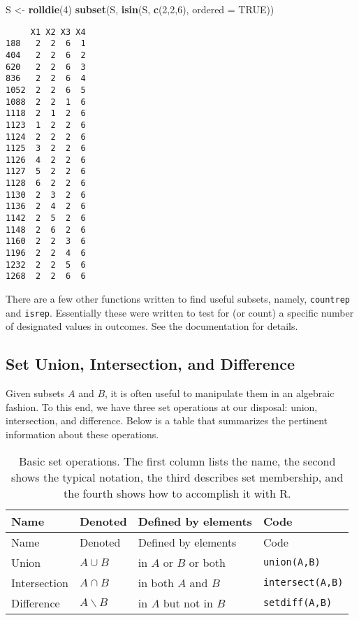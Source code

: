 \documentclass[]{book}
\newenvironment{Shaded}{\begin{snugshade}}{\end{snugshade}}
\newcommand{\KeywordTok}[1]{\textcolor[rgb]{0.13,0.29,0.53}{\textbf{{#1}}}}
\newcommand{\DataTypeTok}[1]{\textcolor[rgb]{0.13,0.29,0.53}{{#1}}}
\newcommand{\DecValTok}[1]{\textcolor[rgb]{0.00,0.00,0.81}{{#1}}}
\newcommand{\StringTok}[1]{\textcolor[rgb]{0.31,0.60,0.02}{{#1}}}
\newcommand{\OtherTok}[1]{\textcolor[rgb]{0.56,0.35,0.01}{{#1}}}
\newcommand{\NormalTok}[1]{{#1}}
\numberwithin{equation}{chapter}
\numberwithin{figure}{chapter}
\theoremstyle{plain}
\theoremstyle{definition}
\theoremstyle{remark}
\theoremstyle{definition}
\theoremstyle{definition}
\theoremstyle{remark}
\begin{document}
\begin{Shaded}
\begin{Highlighting}[]
\NormalTok{S <-}\StringTok{ }\KeywordTok{rolldie}\NormalTok{(}\DecValTok{4}\NormalTok{) }
\KeywordTok{subset}\NormalTok{(S, }\KeywordTok{isin}\NormalTok{(S, }\KeywordTok{c}\NormalTok{(}\DecValTok{2}\NormalTok{,}\DecValTok{2}\NormalTok{,}\DecValTok{6}\NormalTok{), }\DataTypeTok{ordered =} \OtherTok{TRUE}\NormalTok{)) }
\end{Highlighting}
\end{Shaded}

\begin{verbatim}
     X1 X2 X3 X4
188   2  2  6  1
404   2  2  6  2
620   2  2  6  3
836   2  2  6  4
1052  2  2  6  5
1088  2  2  1  6
1118  2  1  2  6
1123  1  2  2  6
1124  2  2  2  6
1125  3  2  2  6
1126  4  2  2  6
1127  5  2  2  6
1128  6  2  2  6
1130  2  3  2  6
1136  2  4  2  6
1142  2  5  2  6
1148  2  6  2  6
1160  2  2  3  6
1196  2  2  4  6
1232  2  2  5  6
1268  2  2  6  6
\end{verbatim}

There are a few other functions written to find useful subsets, namely,
\texttt{countrep} and \texttt{isrep}. Essentially these were written to
test for (or count) a specific number of designated values in outcomes.
See the documentation for details.

\subsection{Set Union, Intersection, and
Difference}\label{set-union-intersection-and-difference}

Given subsets \(A\) and \(B\), it is often useful to manipulate them in
an algebraic fashion. To this end, we have three set operations at our
disposal: union, intersection, and difference. Below is a table that
summarizes the pertinent information about these operations.

\begin{longtable}[]{@{}llll@{}}
\caption{Basic set operations. The first column lists the name, the
second shows the typical notation, the third describes set membership,
and the fourth shows how to accomplish it with R.}\tabularnewline
\toprule
Name & Denoted & Defined by elements & Code\tabularnewline
\midrule
\endfirsthead
\toprule
Name & Denoted & Defined by elements & Code\tabularnewline
\midrule
\endhead
Union & \(A\cup B\) & in \(A\) or \(B\) or both &
\texttt{union(A,B)}\tabularnewline
Intersection & \(A\cap B\) & in both \(A\) and \(B\) &
\texttt{intersect(A,B)}\tabularnewline
Difference & \(A\backslash B\) & in \(A\) but not in \(B\) &
\texttt{setdiff(A,B)}\tabularnewline
\bottomrule
\end{longtable}
\end{document}
